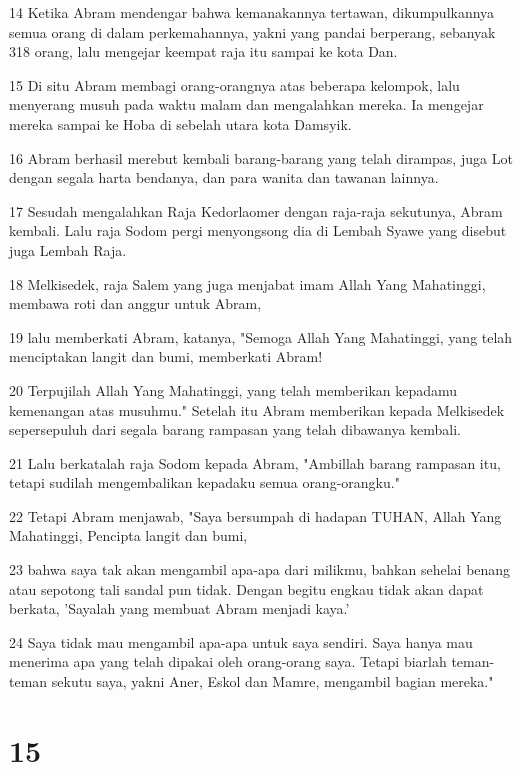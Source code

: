 \par 14 Ketika Abram mendengar bahwa kemanakannya tertawan, dikumpulkannya semua orang di dalam perkemahannya, yakni yang pandai berperang, sebanyak 318 orang, lalu mengejar keempat raja itu sampai ke kota Dan.
\par 15 Di situ Abram membagi orang-orangnya atas beberapa kelompok, lalu menyerang musuh pada waktu malam dan mengalahkan mereka. Ia mengejar mereka sampai ke Hoba di sebelah utara kota Damsyik.
\par 16 Abram berhasil merebut kembali barang-barang yang telah dirampas, juga Lot dengan segala harta bendanya, dan para wanita dan tawanan lainnya.
\par 17 Sesudah mengalahkan Raja Kedorlaomer dengan raja-raja sekutunya, Abram kembali. Lalu raja Sodom pergi menyongsong dia di Lembah Syawe yang disebut juga Lembah Raja.
\par 18 Melkisedek, raja Salem yang juga menjabat imam Allah Yang Mahatinggi, membawa roti dan anggur untuk Abram,
\par 19 lalu memberkati Abram, katanya, "Semoga Allah Yang Mahatinggi, yang telah menciptakan langit dan bumi, memberkati Abram!
\par 20 Terpujilah Allah Yang Mahatinggi, yang telah memberikan kepadamu kemenangan atas musuhmu." Setelah itu Abram memberikan kepada Melkisedek sepersepuluh dari segala barang rampasan yang telah dibawanya kembali.
\par 21 Lalu berkatalah raja Sodom kepada Abram, "Ambillah barang rampasan itu, tetapi sudilah mengembalikan kepadaku semua orang-orangku."
\par 22 Tetapi Abram menjawab, "Saya bersumpah di hadapan TUHAN, Allah Yang Mahatinggi, Pencipta langit dan bumi,
\par 23 bahwa saya tak akan mengambil apa-apa dari milikmu, bahkan sehelai benang atau sepotong tali sandal pun tidak. Dengan begitu engkau tidak akan dapat berkata, 'Sayalah yang membuat Abram menjadi kaya.'
\par 24 Saya tidak mau mengambil apa-apa untuk saya sendiri. Saya hanya mau menerima apa yang telah dipakai oleh orang-orang saya. Tetapi biarlah teman-teman sekutu saya, yakni Aner, Eskol dan Mamre, mengambil bagian mereka."

\chapter{15}

